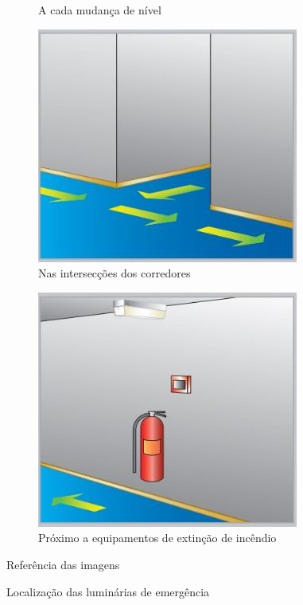 \begin{figure}[H]
\begin{subfigure}[b]{0.30\textwidth}
			\caption{A cada mudança de nível}
			\label{fig: style 1 emergency g}
		\end{subfigure}
		\hfill
		\begin{subfigure}[b]{0.30\textwidth}
			\centering
			\includegraphics[width=\textwidth]{Figures/3. Lighting/light-safety8.jpg}
			\caption{Nas intersecções dos corredores}
			\label{fig: style 1 emergency h}
		\end{subfigure}
		\hfill
		\begin{subfigure}[b]{0.30\textwidth}
			\centering
			\includegraphics[width=\textwidth]{Figures/3. Lighting/light-safety9.jpg}
			\caption{Próximo a equipamentos de extinção de incêndio}
			\label{fig: style 1 emergency i}
		\end{subfigure}
		\caption{Localização das luminárias de emergência} Referência das imagens \cite{eaton2013} 
		\label{fig: safety-luminarires-places}
	\end{figure}
	
	

